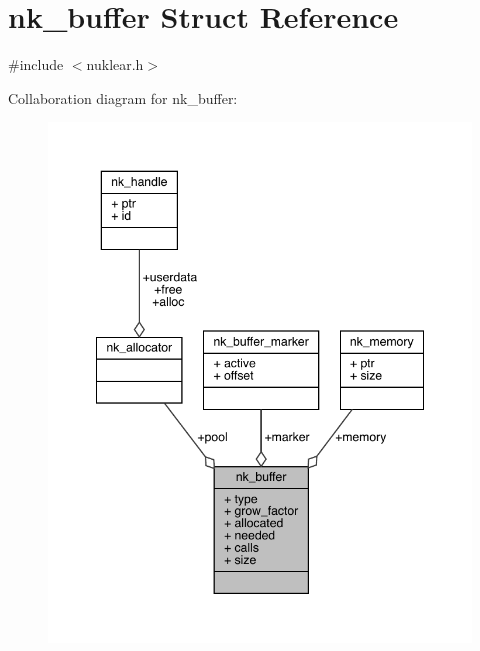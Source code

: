 \hypertarget{structnk__buffer}{}\section{nk\+\_\+buffer Struct Reference}
\label{structnk__buffer}


{\ttfamily \#include $<$nuklear.\+h$>$}



Collaboration diagram for nk\+\_\+buffer\+:
\nopagebreak
\begin{figure}[H]
\begin{center}
\leavevmode
\includegraphics[width=348pt]{structnk__buffer__coll__graph}
\end{center}
\end{figure}

